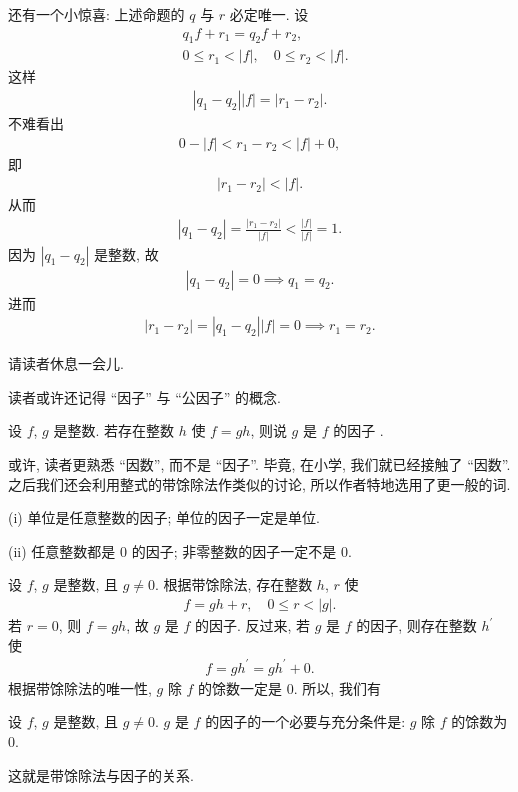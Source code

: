还有一个小惊喜: 上述命题的 $q$ 与 $r$ 必定唯一. 设
\begin{align*}
     & q_1 f + r_1 = q_2 f + r_2,                \\
     & 0 \leq r_1 < |f|, \quad 0 \leq r_2 < |f|.
\end{align*}
这样
\begin{align*}
    |q_1 - q_2| |f| = |r_1 - r_2|.
\end{align*}
不难看出
\begin{align*}
    0 - |f| < r_1 - r_2 < |f| + 0,
\end{align*}
即
\begin{align*}
    |r_1 - r_2| < |f|.
\end{align*}
从而
\begin{align*}
    |q_1 - q_2| = \frac{|r_1 - r_2|}{|f|} < \frac{|f|}{|f|} = 1.
\end{align*}
因为 $|q_1 - q_2|$ 是整数, 故
\begin{align*}
    |q_1 - q_2| = 0 \implies q_1 = q_2.
\end{align*}
进而
\begin{align*}
    |r_1 - r_2| = |q_1 - q_2| |f| = 0 \implies r_1 = r_2.
\end{align*}

请读者休息一会儿.

\myLine

读者或许还记得 ``因子'' 与 ``公因子'' 的概念.
\begin{definition}
    设 $f$, $g$ 是整数. 若存在整数 $h$ 使 $f=gh$, 则说 $g$ 是 $f$ 的因子 .
\end{definition}

\begin{remark}
    或许, 读者更熟悉 ``因数'', 而不是 ``因子''. 毕竟, 在小学, 我们就已经接触了 ``因数''. 之后我们还会利用整式的带馀除法作类似的讨论, 所以作者特地选用了更一般的词.
\end{remark}

\begin{example}
    (i) 单位是任意整数的因子; 单位的因子一定是单位.

    (ii) 任意整数都是 $0$ 的因子; 非零整数的因子一定不是 $0$.
\end{example}

设 $f$, $g$ 是整数, 且 $g \neq 0$. 根据带馀除法, 存在整数 $h$, $r$ 使
\begin{align*}
    f = gh + r, \quad 0 \leq r < |g|.
\end{align*}
若 $r = 0$, 则 $f = gh$, 故 $g$ 是 $f$ 的因子. 反过来, 若 $g$ 是 $f$ 的因子, 则存在整数 $h^{\prime}$ 使
\begin{align*}
    f = gh^{\prime} = gh^{\prime} + 0.
\end{align*}
根据带馀除法的唯一性, $g$ 除 $f$ 的馀数一定是 $0$. 所以, 我们有
\begin{proposition}
    设 $f$, $g$ 是整数, 且 $g \neq 0$. $g$ 是 $f$ 的因子的一个必要与充分条件是: $g$ 除 $f$ 的馀数为 $0$.
\end{proposition}
这就是带馀除法与因子的关系.

